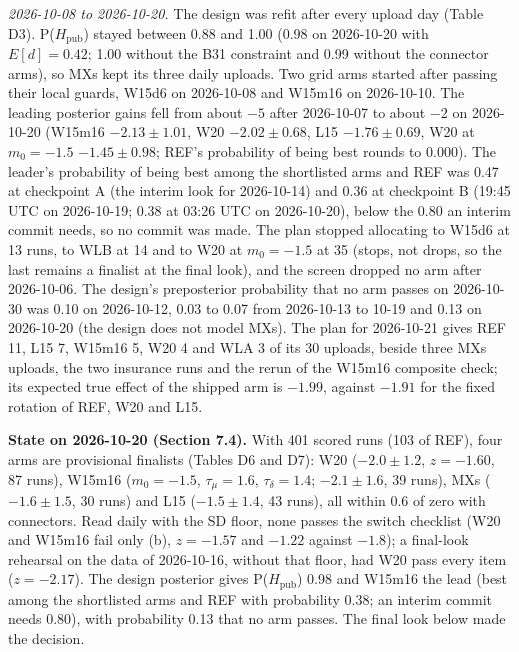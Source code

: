 \documentclass[
]{article}
\begin{document}
\emph{2026-10-08 to 2026-10-20.} The design was refit after every upload
day (Table D3). P(\(H_{\mathrm{pub}}\)) stayed between 0.88 and 1.00
(0.98 on 2026-10-20 with \(E[d] = 0.42\); 1.00 without the B31
constraint and 0.99 without the connector arms), so MXs kept its three
daily uploads. Two grid arms started after passing their local guards,
W15d6 on 2026-10-08 and W15m16 on 2026-10-10. The leading posterior
gains fell from about \(-5\) after 2026-10-07 to about \(-2\) on
2026-10-20 (W15m16 \(-2.13 \pm 1.01\), W20 \(-2.02 \pm 0.68\), L15
\(-1.76 \pm 0.69\), W20 at \(m_0 = -1.5\) \(-1.45 \pm 0.98\); REF's
probability of being best rounds to 0.000). The leader's probability of
being best among the shortlisted arms and REF was 0.47 at checkpoint A
(the interim look for 2026-10-14) and 0.36 at checkpoint B (19:45 UTC on
2026-10-19; 0.38 at 03:26 UTC on 2026-10-20), below the 0.80 an interim
commit needs, so no commit was made. The plan stopped allocating to
W15d6 at 13 runs, to WLB at 14 and to W20 at \(m_0 = -1.5\) at 35
(stops, not drops, so the last remains a finalist at the final look),
and the screen dropped no arm after 2026-10-06. The design's
preposterior probability that no arm passes on 2026-10-30 was 0.10 on
2026-10-12, 0.03 to 0.07 from 2026-10-13 to 10-19 and 0.13 on 2026-10-20
(the design does not model MXs). The plan for 2026-10-21 gives REF 11,
L15 7, W15m16 5, W20 4 and WLA 3 of its 30 uploads, beside three MXs
uploads, the two insurance runs and the rerun of the W15m16 composite
check; its expected true effect of the shipped arm is \(-1.99\), against
\(-1.91\) for the fixed rotation of REF, W20 and L15.

\textbf{State on 2026-10-20 (Section 7.4).} With 401 scored runs (103 of
REF), four arms are provisional finalists (Tables D6 and D7): W20
(\(-2.0 \pm 1.2\), \(z = -1.60\), 87 runs), W15m16 (\(m_0 = -1.5\),
\(\tau_\mu = 1.6\), \(\tau_\delta = 1.4\); \(-2.1 \pm
1.6\), 39 runs), MXs (\(-1.6 \pm 1.5\), 30 runs) and L15
(\(-1.5 \pm 1.4\), 43 runs), all within 0.6 of zero with connectors.
Read daily with the SD floor, none passes the switch checklist (W20 and
W15m16 fail only (b), \(z = -1.57\) and \(-1.22\) against \(-1.8\)); a
final-look rehearsal on the data of 2026-10-16, without that floor, had
W20 pass every item (\(z = -2.17\)). The design posterior gives
P(\(H_{\mathrm{pub}}\)) 0.98 and W15m16 the lead (best among the
shortlisted arms and REF with probability 0.38; an interim commit needs
0.80), with probability 0.13 that no arm passes. The final look below
made the decision.
\end{document}
